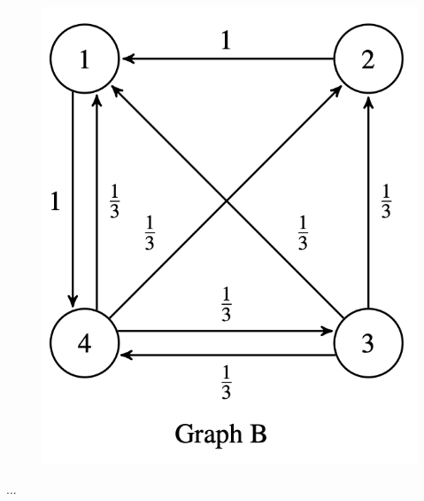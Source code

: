 \documentclass[11pt]{article}
\begin{document}
\begin{enumerate}
\begin{enumerate}
	      			
    	      		\begin{figure}[h]
                            \centering
                            \includegraphics[scale=0.2]{q9b}
                    \end{figure}
      			      \begin{Answer}
      			      	...
      			      \end{Answer}
	      			      	      			          


\end{enumerate}
\end{enumerate}
\end{document}
